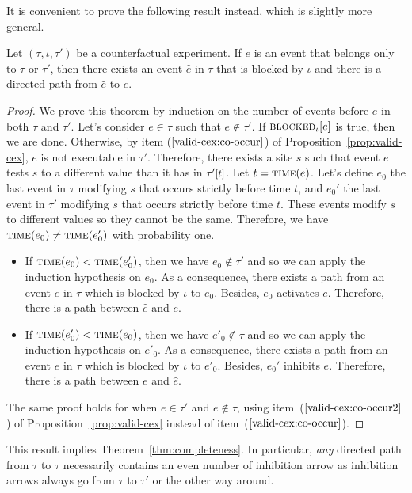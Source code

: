 It is convenient to prove the following result instead, which is
slightly more general.
\begin{theorem*} Let $(\tau, \iota, \tau')$ be a counterfactual
  experiment. If $e$ is an event that belongs only to $\tau$
  or $\tau'$, then there exists an event $\hat e$ in
  $\tau$ that is blocked by $\iota$ and there is a directed path 
  from $\hat e$ to $e$.
\end{theorem*}
\begin{proof}
  We prove this theorem by induction on the number of events before
  $e$ in both $\tau$ and $\tau'$. Let's consider $e \in \tau$ such
  that $e \notin \tau'$. If ${\textsc{blocked}}_{\iota}[e]$ is true, then we are
  done. Otherwise, by item ($\ref{valid-cex:co-occur}$) of
  Proposition~\ref{prop:valid-cex}, $e$ is not executable in
  $\tau'$. Therefore, there exists a site $s$ such that event $e$
  tests $s$ to a different value than it has in $\TSTATE{t}{\tau'}$.
  Let $t = \textsc{time}(e)$.  Let's define $e_0$ the last event in $\tau$
  modifying $s$ that occurs strictly before time $t$, and $e_0'$ the
  last event in $\tau'$ modifying $s$ that occurs strictly before time
  $t$. These events modify $s$ to different values so they cannot be
  the same. Therefore, we have $\textsc{time}(e_0) \neq \textsc{time}(e_0')$ with
  probability one.

  \begin{itemize}
  \item If $\textsc{time}(e_0) < \textsc{time}(e_0')$, then we have
    $e_0 \notin \tau'$ and so we can apply the induction hypothesis on
    $e_0$. As a consequence, there exists a path from an event
    $\hat e$ in $\tau$ which is blocked by $\iota$ to $e_0$. Besides,
    $e_0$ activates $e$. Therefore, there is a path between $\hat e$
    and $e$.
  \item If $\textsc{time}(e_0') < \textsc{time}(e_0)$, then we have
    $e'_0 \notin \tau$ and so we can apply the induction
    hypothesis on $e'_0$. As a consequence, there exists a path from
    an event $\hat e$ in $\tau$ which is blocked by $\iota$ to
    $e'_0$. Besides, $e_0'$ inhibits $e$. Therefore, there is a path
    between $e$ and $\hat e$.
  \end{itemize}
  The same proof holds for when $e \in \tau'$ and $e \notin \tau$,
  using item~($\ref{valid-cex:co-occur2}$) of
  Proposition~\ref{prop:valid-cex} instead of
  item~($\ref{valid-cex:co-occur}$).
\end{proof}
This result implies Theorem~\ref{thm:completeness}. In particular,
\emph{any} directed path from $\tau$ to $\tau$ necessarily contains an
even number of inhibition arrow as inhibition arrows always go from
$\tau$ to $\tau'$ or the other way around.
